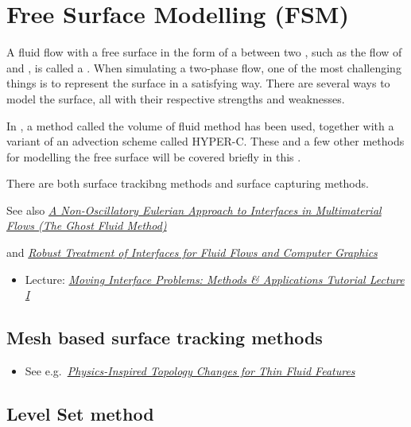 \chapter{Free Surface Modelling (FSM)}

A fluid flow with a free surface in the form of a  between two , such as the flow of \water and \air, is called a . When simulating a two-phase flow, one of the most challenging things is to represent the surface in a satisfying way. There are several ways to model the surface, all with their respective strengths and weaknesses.

In \thisprojectwork, a method called the volume of fluid method has been used, together with a variant of an advection scheme called HYPER-C. These and a few other methods for modelling the free surface will be covered briefly in this \levelname.


\HRule

There are both surface trackibng methods and surface capturing methods.

See also \textit{\href{http://physbam.stanford.edu/~fedkiw/papers/cam1998-17.pdf}{A Non-Oscillatory Eulerian Approach to Interfaces in Multimaterial Flows (The Ghost Fluid Method)}}

and \textit{\href{http://physbam.stanford.edu/~fedkiw/papers/stanford2002-07.pdf}{Robust Treatment of Interfaces for Fluid Flows and Computer Graphics}}

\begin{itemize}
    \item Lecture: \textit{\href{http://www.ims.nus.edu.sg/Programs/fluiddynamic/files/Lecture1-basics.pdf}{Moving Interface Problems: Methods \& Applications Tutorial Lecture I}}
\end{itemize}

\section{Mesh based surface tracking methods}

\begin{itemize}
    \item See e.g.\ \textit{\href{http://www.cc.gatech.edu/~turk/my_papers/thin_fluid_features.pdf}{Physics-Inspired Topology Changes for Thin Fluid Features}}
\end{itemize}

\section{Level Set method}

